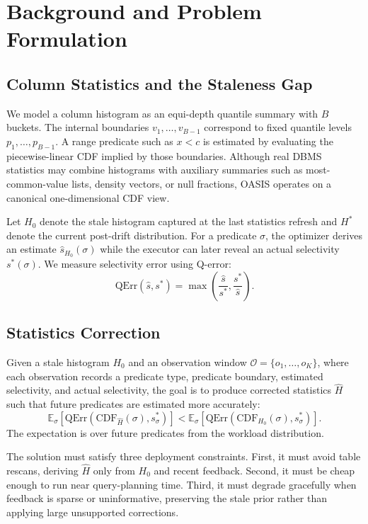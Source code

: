 \documentclass[preprint,12pt]{elsarticle}
\begin{document}
\section{Background and Problem Formulation}
\label{sec:background}

\subsection{Column Statistics and the Staleness Gap}

We model a column histogram as an equi-depth quantile summary with $B$ buckets.
The internal boundaries $v_1,\ldots,v_{B-1}$ correspond to fixed quantile
levels $p_1,\ldots,p_{B-1}$. A range predicate such as $x < c$ is estimated by
evaluating the piecewise-linear CDF implied by those boundaries. Although real
DBMS statistics may combine histograms with auxiliary summaries such as
most-common-value lists, density vectors, or null fractions, OASIS operates on
a canonical one-dimensional CDF view.

Let $H_0$ denote the stale histogram captured at the last statistics refresh
and $H^*$ denote the current post-drift distribution. For a predicate $\sigma$,
the optimizer derives an estimate $\hat{s}_{H_0}(\sigma)$ while the executor
can later reveal an actual selectivity $s^*(\sigma)$. We measure selectivity
error using Q-error:
\begin{equation}
  \mathrm{QErr}(\hat{s},s^*) =
  \max\left(\frac{\hat{s}}{s^*}, \frac{s^*}{\hat{s}}\right).
  \label{eq:qerr}
\end{equation}

\subsection{Statistics Correction}

Given a stale histogram $H_0$ and an observation window
$\mathcal{O}=\{o_1,\ldots,o_K\}$, where each observation records a predicate
type, predicate boundary, estimated selectivity, and actual selectivity, the
goal is to produce corrected statistics $\hat{H}$ such that future predicates
are estimated more accurately:
\[
  \mathbb{E}_{\sigma}\left[
    \mathrm{QErr}\left(\mathrm{CDF}_{\hat{H}}(\sigma),s^*_{\sigma}\right)
  \right]
  <
  \mathbb{E}_{\sigma}\left[
    \mathrm{QErr}\left(\mathrm{CDF}_{H_0}(\sigma),s^*_{\sigma}\right)
  \right].
\]
The expectation is over future predicates from the workload distribution.

The solution must satisfy three deployment constraints. First, it must avoid
table rescans, deriving $\hat{H}$ only from $H_0$ and recent feedback. Second,
it must be cheap enough to run near query-planning time. Third, it must degrade
gracefully when feedback is sparse or uninformative, preserving the stale prior
rather than applying large unsupported corrections.
\end{document}
